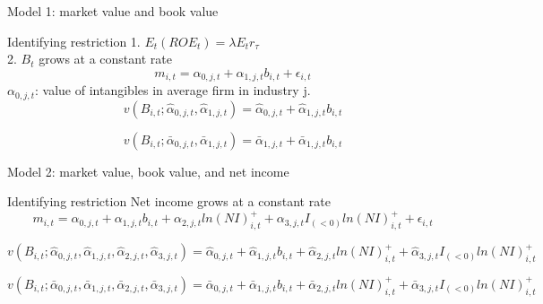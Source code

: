 \documentclass[aspectratio=169,xcolor=dvipsnames]{beamer}
\begin{document}
\begin{frame}{Model 1: market value and book value}
    \begin{block}{Identifying restriction}
        1. $E_t(ROE_t) = \lambda E_t r_\tau$ \\
        2. $B_t$ grows at a constant rate
        \begin{equation}
            m_{i,t} = \alpha_{0,j,t} + \alpha_{1,j,t} b_{i,t} + \epsilon_{i,t}
        \end{equation}
        $\alpha_{0,j,t}$: value of intangibles in average firm in industry j.
        \begin{equation}
            v(B_{i,t}; \hat{\alpha}_{0, j,t}, \hat{\alpha}_{1, j,t}) = \hat{\alpha}_{0, j,t} + \hat{\alpha}_{1, j,t} b_{i,t}
        \end{equation}

        \begin{equation}
            v(B_{i,t}; \bar{\alpha}_{0, j,t}, \bar{\alpha}_{1, j,t}) = \bar{\alpha}_{1, j,t} + \bar{\alpha}_{1, j,t} b_{i,t}
        \end{equation}
    \end{block}
\end{frame}


\begin{frame}{Model 2: market value, book value, and net income}
    \begin{block}{Identifying restriction}
        Net income grows at a constant rate
        \begin{equation}
            m_{i,t} = \alpha_{0,j,t} + \alpha_{1,j,t} b_{i,t} + \alpha_{2,j,t} ln(NI)^{+}_{i,t} + \alpha_{3,j,t} I_{(<0)} ln(NI)^{+}_{i,t} + \epsilon_{i,t}
        \end{equation}

        \begin{equation}
            v(B_{i,t}; \hat{\alpha}_{0, j,t}, \hat{\alpha}_{1, j,t}, \hat{\alpha}_{2, j,t}, \hat{\alpha}_{3, j,t}) = \hat{\alpha}_{0, j,t} + \hat{\alpha}_{1, j,t} b_{i,t} + \hat{\alpha}_{2, j,t}ln(NI)^{+}_{i,t} + \hat{\alpha}_{3, j,t} I_{(<0)} ln(NI)^{+}_{i,t}
        \end{equation}

        \begin{equation}
            v(B_{i,t}; \bar{\alpha}_{0, j,t}, \bar{\alpha}_{1, j,t}, \bar{\alpha}_{2, j,t}, \bar {\alpha}_{3, j,t}) = \bar {\alpha}_{0, j,t} + \bar {\alpha}_{1, j,t} b_{i,t} + \bar {\alpha}_{2, j,t}ln(NI)^{+}_{i,t} + \bar {\alpha}_{3, j,t} I_{(<0)} ln(NI)^{+}_{i,t}
        \end{equation}
    \end{block}
\end{frame}
\end{document}
